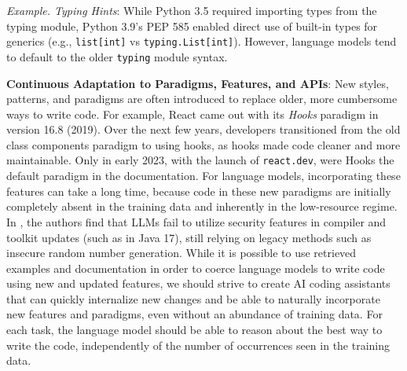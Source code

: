 

\begin{tcolorbox}[colback=lightblue, boxrule=0pt, arc=5pt, outer arc=5pt, after skip=10pt plus 2pt]
\textit{Example. Typing Hints}: While Python 3.5 required importing types from the typing module, Python 3.9's PEP 585 enabled direct use of built-in types for generics (e.g., \texttt{\small list[int]} vs \texttt{\small typing.List[int]}). However, language models tend to default to the older \texttt{typing} module syntax.
\end{tcolorbox}


\textbf{Continuous Adaptation to Paradigms, Features, and APIs}: New styles, patterns, and paradigms are often introduced to replace older, more cumbersome ways to write code. For example, React came out with its \textit{Hooks} paradigm in version 16.8 (2019). Over the next few years, developers transitioned from the old class components paradigm to using hooks, as hooks made code cleaner and more maintainable. Only in early 2023, with the launch of \texttt{react.dev}, were Hooks the default paradigm in the documentation. For language models, incorporating these features can take a long time, because code in these new paradigms are initially completely absent in the training data and inherently in the low-resource regime. In \citet{kharma2025security}, the authors find that LLMs fail to utilize security features in compiler and toolkit updates (such as in Java 17), still relying on legacy methods such as insecure random number generation. While it is possible to use retrieved examples and documentation in order to coerce language models to write code using new and updated features, we should strive to create AI coding assistants that can quickly internalize new changes and be able to naturally incorporate new features and paradigms, even without an abundance of training data. For each task, the language model should be able to reason about the best way to write the code, independently of the number of occurrences seen in the training data.

